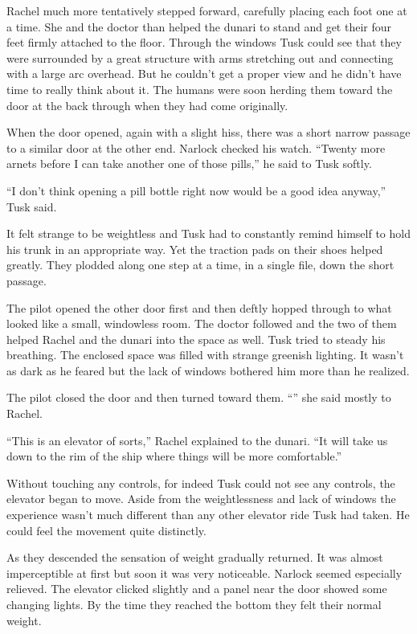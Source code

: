 Rachel much more tentatively stepped forward, carefully placing each foot one at a time. She and
the doctor than helped the dunari to stand and get their four feet firmly attached to the floor.
Through the windows Tusk could see that they were surrounded by a great structure with arms
stretching out and connecting with a large arc overhead. But he couldn't get a proper view and
he didn't have time to really think about it. The humans were soon herding them toward the door
at the back through when they had come originally.

When the door opened, again with a slight hiss, there was a short narrow passage to a similar
door at the other end. Narlock checked his watch. ``Twenty more arnets before I can take another
one of those pills,'' he said to Tusk softly.

``I don't think opening a pill bottle right now would be a good idea anyway,'' Tusk said.

It felt strange to be weightless and Tusk had to constantly remind himself to hold his trunk in
an appropriate way. Yet the traction pads on their shoes helped greatly. They plodded along one
step at a time, in a single file, down the short passage.

The pilot opened the other door first and then deftly hopped through to what looked like a
small, windowless room. The doctor followed and the two of them helped Rachel and the dunari
into the space as well. Tusk tried to steady his breathing. The enclosed space was filled with
strange greenish lighting. It wasn't as dark as he feared but the lack of windows bothered him
more than he realized.

The pilot closed the door and then turned toward them. ``'' she said
mostly to Rachel.

``This is an elevator of sorts,'' Rachel explained to the dunari. ``It will take us down to the
rim of the ship where things will be more comfortable.''

Without touching any controls, for indeed Tusk could not see any controls, the elevator began to
move. Aside from the weightlessness and lack of windows the experience wasn't much different
than any other elevator ride Tusk had taken. He could feel the movement quite distinctly.

As they descended the sensation of weight gradually returned. It was almost imperceptible at
first but soon it was very noticeable. Narlock seemed especially relieved. The elevator clicked
slightly and a panel near the door showed some changing lights. By the time they reached the
bottom they felt their normal weight.


